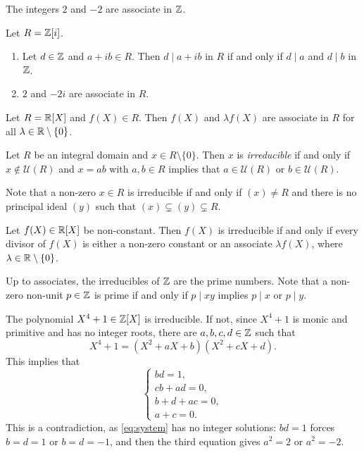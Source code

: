 \begin{example}
	The integers $2$ and $-2$ are associate in $\mathbb{Z}$.	
\end{example}

\begin{example}
	Let $R=\mathbb{Z}[i]$. 
	\begin{enumerate}
		\item Let $d\in\mathbb{Z}$ and $a+ib\in R$. Then $d\mid a+ib$ in $R$ if and only if 
			$d\mid a$ and $d\mid b$ in $\mathbb{Z}$. 
		\item $2$ and $-2i$ are associate in $R$.
	\end{enumerate} 	
\end{example}

\begin{example}
	Let $R=\mathbb{R}[X]$ and $f(X)\in R$. Then $f(X)$ and $\lambda f(X)$ are 
	associate in $R$ for all $\lambda\in\mathbb{R}\setminus\{0\}$.  	
\end{example}

\begin{definition}
	Let $R$ be an integral domain and $x\in R\setminus\{0\}$. Then $x$ is \emph{irreducible} 
	if and only if $x\not\in\mathcal{U}(R)$ 
	and $x=ab$ with $a,b\in R$ implies that $a\in\mathcal{U}(R)$ or $b\in\mathcal{U}(R)$. 
\end{definition}

Note that a non-zero $x\in R$ is irreducible if and only if $(x)\ne R$ 
and there is no principal ideal $(y)$ such that 
$(x)\subsetneq (y)\subsetneq R$.

\begin{example}
  Let $f(X)\in\mathbb{R}[X]$ be non-constant. Then $f(X)$ is irreducible if and only if
  every divisor of $f(X)$ is either a non-zero constant or an associate
  $\lambda f(X)$, where $\lambda\in\mathbb{R}\setminus\{0\}$. 
\end{example}

Up to associates, the irreducibles of $\mathbb{Z}$ are the prime numbers. Note that a
non-zero non-unit $p\in \mathbb{Z}$ is prime if and only if $p\mid xy$ implies $p\mid
x$ or $p\mid y$. 

\begin{example}
    The polynomial $X^4+1\in\mathbb{Z}[X]$ is irreducible. If not, 
    since $X^4+1$ is monic and primitive and 
    has no integer roots, there are 
    $a,b,c,d\in\mathbb{Z}$ such that
    \[
    X^4+1=(X^2+aX+b)(X^2+cX+d).
    \]
    This implies that 
    \begin{equation}
    \label{eq:system}
    \begin{cases}
    bd=1,\\
    cb+ad=0,\\
    b+d+ac=0,\\
    a+c=0.
    \end{cases}
    \end{equation}
    This is a contradiction, as \eqref{eq:system} has no integer solutions:
    $bd=1$ forces $b=d=1$ or $b=d=-1$, and then the third equation gives
    $a^2=2$ or $a^2=-2$.
\end{example}

